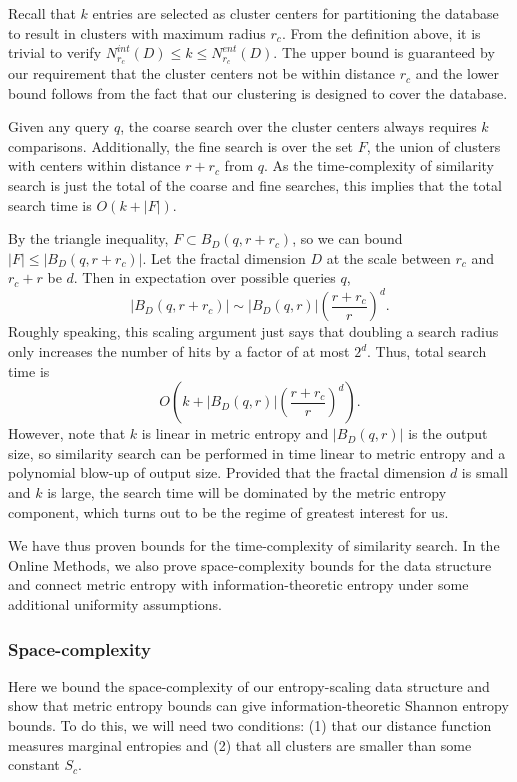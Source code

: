 \documentclass[review,preprint,12pt]{elsarticle}
\theoremstyle{definition}
\theoremstyle{remark}
\numberwithin{equation}{section}
\begin{document}
Recall that $k$ entries are selected as cluster centers for partitioning the database to result in clusters with maximum radius $r_c$.
From the definition above, it is trivial to verify $ N_{r_c}^{int}(D) \le k \le N_{r_c}^{ent} (D)$.
The upper bound is guaranteed by our requirement that the cluster centers not be within distance $r_c$ and the lower bound follows from the fact that our clustering is designed to cover the database.

Given any query $q$, the coarse search over the cluster centers always requires $k$ comparisons.
Additionally, the fine search is over the set $F$, the union of clusters with centers within distance $r+r_c$ from $q$.
As the time-complexity of similarity search is just the total of the coarse and fine searches, this implies that the total search time is $O(k + |F|)$.

By the triangle inequality, $F \subset B_D(q,r+r_c)$,
so we can bound $|F| \le |B_D(q,r+r_c)|$.
Let the fractal dimension $D$ at the scale between $r_c$ and $r_c + r$ be $d$.
Then in expectation over possible queries $q$,
\[
    \left|B_D(q, r+r_c)\right| \sim \left|B_D(q,r)\right|\left(\frac{r+r_c}{r}\right)^d .
\]
Roughly speaking, this scaling argument just says that doubling a search radius only increases the number of hits by a factor of at most $2^d$.
Thus, total search time is 
\[
    O\left(k + \left|B_D(q,r)\right|\left(\frac{r+r_c}{r}\right)^d \right).
\]
However, note that $k$ is linear in metric entropy and $|B_D(q,r)|$ is the output size, so similarity search can be performed in time linear to metric entropy and a polynomial blow-up of output size.
Provided that the fractal dimension $d$ is small and $k$ is large, the search time will be dominated by the metric entropy component, which turns out to be the regime of greatest interest for us.

We have thus proven bounds for the time-complexity of similarity search.
In the Online Methods, we also prove space-complexity bounds for the data structure and connect metric entropy with information-theoretic entropy under some additional uniformity assumptions.

\subsubsection{Space-complexity}
Here we bound the space-complexity of our entropy-scaling data structure and show that metric entropy bounds can give information-theoretic Shannon entropy bounds.
To do this, we will need two conditions: (1) that our distance function measures marginal entropies and (2) that all clusters are smaller than some constant $S_c$.
\end{document}
